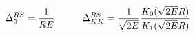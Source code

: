 \begin{equation}
\label{zerokk}
\Delta_0^{RS} = \frac{1}{R E}
\hspace{1.0cm}
\Delta_{KK}^{RS} = \frac{1}{\sqrt{2 E}}
\frac{K_0(\sqrt{2 E} R)}{K_1(\sqrt{2 E} R)}
\end{equation}

